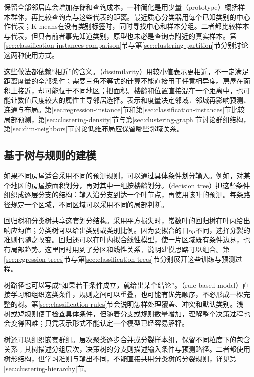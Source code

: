 保留全部邻居库会增加存储和查询成本，一种简化是用少量（prototype）概括样本群体，再比较查询点与这些代表的距离。最近质心分类器用每个已知类别的中心作代表；K-means在没有类别标签时，同时寻找中心和样本分组。二者都比较样本与代表，但只有前者事先知道类别，原型也未必是查询点附近的真实样本。第\ref{sec:classification-instances-comparison}节与第\ref{sec:clustering-partition}节分别讨论这两种使用方式。

这些做法都依赖“相近”的含义。（dissimilarity）用较小值表示更相近，不一定满足距离度量的全部条件；需要三角不等式的计算不能直接用于任意相异度。房屋在面积上接近，却可能位于不同地区；把面积、楼龄和位置直接混在一个距离中，也可能让数值尺度较大的属性主导邻居选择。表示和度量决定邻域，邻域再影响预测、连通与布局。第\ref{sec:regression-instance}节和第\ref{sec:classification-instances}节比较局部预测，第\ref{sec:clustering-density}节与第\ref{sec:clustering-graph}节讨论群组结构，第\ref{sec:dim-neighbors}节讨论低维布局应保留哪些邻域关系。

\subsection{基于树与规则的建模}
\label{sec:classic-overview-tree-rules}

如果不同房屋适合采用不同的预测规则，可以通过具体条件划分输入。例如，对某个地区的房屋按面积划分，再对其中一组按楼龄划分。（decision tree）把这些条件组织成逐层分支的结构：输入沿分支到达一个叶节点，再使用该叶的预测。每条路径规定一个区域，不同区域可以采用不同的局部判断。

回归树和分类树共享这套划分结构。采用平方损失时，常数叶的回归树在叶内给出响应均值；分类树可以给出类别或类别比例。因为要拟合的目标不同，选择分裂的准则也随之改变。回归还可以在叶内拟合线性模型，使一片区域既有条件边界，也有局部趋势。这里同时用到了分区和线性关系，说明建模思路可以组合。第\ref{sec:regression-trees}节与第\ref{sec:classification-trees}节分别展开这些训练与预测过程。

树路径也可以写成“如果若干条件成立，就给出某个结论”。（rule-based model）直接学习和组织这类条件，规则之间可以重叠，也可能有优先顺序，不必形成一棵完整的树。第\ref{sec:classification-rules}节会说明怎样处理覆盖、冲突和默认类别。浅树或短规则便于检查具体条件，但随着分支或规则数量增加，理解整个决策过程也会变得困难；只凭表示形式不能认定一个模型已经容易解释。

树还可以组织嵌套群组。层次聚类逐步合并或分裂样本组，保留不同粒度下的包含关系；其树描述分组层次，决策树的分支则描述输入条件与预测路径。二者都使用树形结构，但学习准则与输出不同，不能直接共用分类树的分裂规则，详见第\ref{sec:clustering-hierarchy}节。

